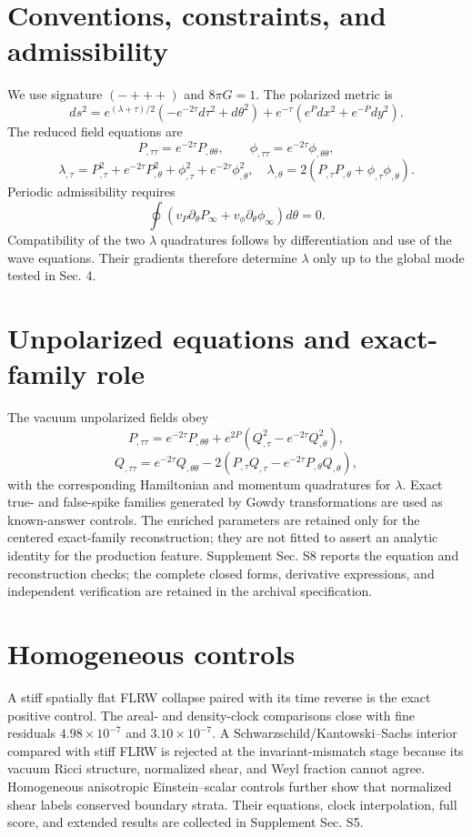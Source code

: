 \documentclass{iopjournal}
\begin{document}
\section{Conventions, constraints, and admissibility}
We use signature $(-+++)$ and $8\pi G=1$. The polarized metric is
\[
ds^2=e^{(\lambda+\tau)/2}(-e^{-2\tau}d\tau^2+d\theta^2)
+e^{-\tau}(e^Pdx^2+e^{-P}dy^2).
\]
The reduced field equations are
\[
P_{,\tau\tau}=e^{-2\tau}P_{,\theta\theta},\qquad
\phi_{,\tau\tau}=e^{-2\tau}\phi_{,\theta\theta},
\]
\[
\lambda_{,\tau}=P_{,\tau}^2+e^{-2\tau}P_{,\theta}^2+\phi_{,\tau}^2+e^{-2\tau}\phi_{,\theta}^2,
\quad
\lambda_{,\theta}=2(P_{,\tau}P_{,\theta}+\phi_{,\tau}\phi_{,\theta}).
\]
Periodic admissibility requires
\[
\oint(v_P\partial_\theta P_\infty+v_\phi\partial_\theta\phi_\infty)d\theta=0.
\]
Compatibility of the two $\lambda$ quadratures follows by differentiation and use of the wave equations. Their gradients therefore determine $\lambda$ only up to the global mode tested in Sec. 4.

\section{Unpolarized equations and exact-family role}
The vacuum unpolarized fields obey
\[
P_{,\tau\tau}=e^{-2\tau}P_{,\theta\theta}+e^{2P}(Q_{,\tau}^2-e^{-2\tau}Q_{,\theta}^2),
\]
\[
Q_{,\tau\tau}=e^{-2\tau}Q_{,\theta\theta}-2(P_{,\tau}Q_{,\tau}-e^{-2\tau}P_{,\theta}Q_{,\theta}),
\]
with the corresponding Hamiltonian and momentum quadratures for $\lambda$. Exact true- and false-spike families generated by Gowdy transformations are used as known-answer controls. The enriched parameters are retained only for the centered exact-family reconstruction; they are not fitted to assert an analytic identity for the production feature. Supplement Sec. S8 reports the equation and reconstruction checks; the complete closed forms, derivative expressions, and independent verification are retained in the archival specification.

\section{Homogeneous controls}
A stiff spatially flat FLRW collapse paired with its time reverse is the exact positive control. The areal- and density-clock comparisons close with fine residuals $4.98\times10^{-7}$ and $3.10\times10^{-7}$. A Schwarzschild/Kantowski--Sachs interior compared with stiff FLRW is rejected at the invariant-mismatch stage because its vacuum Ricci structure, normalized shear, and Weyl fraction cannot agree. Homogeneous anisotropic Einstein--scalar controls further show that normalized shear labels conserved boundary strata. Their equations, clock interpolation, full score, and extended results are collected in Supplement Sec. S5.
\end{document}
